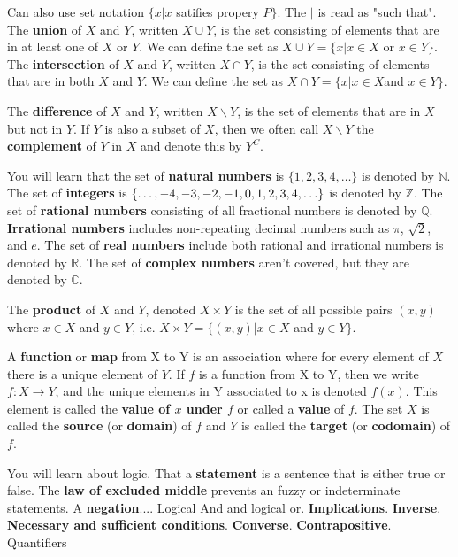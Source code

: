 \documentclass[openany,10pt]{book}
\begin{document}
Can also use set notation $\{x|x$ satifies propery $P\}$.  The $|$ is read as "such that". The \textbf{union} of $X$ and $Y$, written $X\cup Y$, is the set consisting of elements that are in at least one of $X$ or $Y$.  We can define the set as $X\cup Y = \{x|x\in X$ or $x\in Y\}$.  The \textbf{intersection} of $X$ and $Y$, written $X\cap Y$, is the set consisting of elements that are in both $X$ and $Y$.  We can define the set as $X\cap Y = \{x|x\in X$and $x\in Y\}$.

The \textbf{difference} of $X$ and $Y$, written $X\backslash Y$, is the set of elements that are in $X$ but not in $Y$.  If $Y$ is also a subset of $X$, then we often call $X\backslash Y$ the \textbf{complement} of $Y$ in $X$ and denote this by $Y^C$.

You will learn that the set of \textbf{natural numbers} is $\{1,2,3,4,\ldots\}$ is denoted by $\mathbb{N}$.  The set of \textbf{integers} is $\{\ldots,-4,-3,-2,-1,0,1,2,\\3,4,\ldots\}$ is denoted by $\mathbb{Z}$.  The set of \textbf{rational numbers} consisting of all fractional numbers is denoted by $\mathbb{Q}$.  \textbf{Irrational numbers} includes non-repeating decimal numbers such as $\pi$, $\sqrt{2}$, and $e$.  The set of \textbf{real numbers} include both rational and irrational numbers is denoted by $\mathbb{R}$.  The set of \textbf{complex numbers} aren't covered, but they are denoted by $\mathbb{C}$.

The \textbf{product} of $X$ and $Y$, denoted $X\times Y$ is the set of all possible pairs $(x,y)$ where $x\in X$ and $y \in Y$, i.e. $X \times Y = \{(x,y)|x\in X$ and $y\in Y\}$.  

A \textbf{function} or \textbf{map} from X to Y is an association where for every element of $X$ there is a unique element of $Y$.  If $f$ is a function from X to Y, then we write $f:X\rightarrow Y$, and the unique elements in Y associated to x is denoted $f(x)$.  This element is called the \textbf{value of $x$ under $f$} or called a \textbf{value} of $f$.  The set $X$ is called the \textbf{source} (or \textbf{domain}) of $f$ and $Y$ is called the \textbf{target} (or \textbf{codomain}) of $f$.

You will learn about logic.  That a \textbf{statement} is a sentence that is either true or false.  The \textbf{law of excluded middle} prevents an fuzzy or indeterminate statements.  A \textbf{negation}.... Logical And and logical or.  \textbf{Implications}.  \textbf{Inverse}.  \textbf{Necessary and sufficient conditions}.    \textbf{Converse}. \textbf{Contrapositive}. Quantifiers
\end{document}
